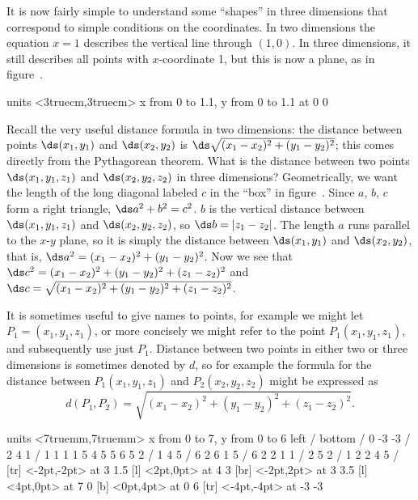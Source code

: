 It is now fairly simple to understand some ``shapes'' in three
dimensions that correspond to simple conditions on the coordinates. In
two dimensions the equation $x=1$ describes the vertical line through
$(1,0)$. In three dimensions, it still describes all points with
$x$-coordinate 1, but this is now a plane, as in
figure~.

\figure
\vbox{\beginpicture
\normalgraphs
\ninepoint
\setcoordinatesystem units <3truecm,3truecm>
\setplotarea x from 0 to 1.1, y from 0 to 1.1
 at 0 0
\endpicture}
\endfigure{The plane $x=1$.
(\expandafter\url\expandafter{\liveurl plane.html}%
AP\endurl)}

Recall the very useful distance formula in two dimensions: the
distance between points $\ds (x_1,y_1)$ and $\ds (x_2,y_2)$ is
$\ds \sqrt{(x_1-x_2)^2+(y_1-y_2)^2}$; this comes directly from the
Pythagorean theorem. What is the distance between two points
$\ds (x_1,y_1,z_1)$ and $\ds (x_2,y_2,z_2)$ in three dimensions?
Geometrically, we want the length of the long diagonal labeled $c$ in
the ``box'' in figure~. Since $a$,
$b$, $c$ form a right triangle, $\ds a^2+b^2=c^2$. $b$ is the vertical
distance between $\ds (x_1,y_1,z_1)$ and $\ds (x_2,y_2,z_2)$, so
$\ds b=|z_1-z_2|$.  The length $a$ runs parallel to the $x$-$y$ plane, so
it is simply the distance between $\ds (x_1,y_1)$ and $\ds (x_2,y_2)$, that
is, $\ds a^2=(x_1-x_2)^2+(y_1-y_2)^2$. Now we see that
$\ds c^2=(x_1-x_2)^2+(y_1-y_2)^2+(z_1-z_2)^2$ and
$\ds c=\sqrt{(x_1-x_2)^2+(y_1-y_2)^2+(z_1-z_2)^2}$. 

It is sometimes useful to give names to points, for example we might
let $P_1=(x_1,y_1,z_1)$, or more concisely we might refer to the point
$P_1(x_1,y_1,z_1)$, and subsequently use just $P_1$. Distance between
two points in either two or three dimensions is sometimes denoted by
$d$, so for example the formula for the distance between $P_1(x_1,y_1,z_1)$
and $P_2(x_2,y_2,z_2)$ might be expressed as
$$d(P_1,P_2)=\sqrt{(x_1-x_2)^2+(y_1-y_2)^2+(z_1-z_2)^2}.$$

\figure
\vbox{\beginpicture
\normalgraphs
\ninepoint
\setcoordinatesystem units <7truemm,7truemm>
\setplotarea x from 0 to 7, y from 0 to 6
\axis left /
\axis bottom /
 0 -3 -3 /
\setdashes
{} 2 4 1 /
 1 1 1 1 5 4 5 5 6 5 2 /
 1 4 5 /
 6 2 6 1 5 /
\setdots
{} 6 2 2 1 1 /
 2 5 2 /
\setsolid
{} 1 2 2 4 5 /
 [tr] <-2pt,-2pt> at 3 1.5
 [l] <2pt,0pt> at 4 3
 [br] <-2pt,2pt> at 3 3.5
 [l] <4pt,0pt> at 7 0
 [b] <0pt,4pt> at 0 6
 [tr] <-4pt,-4pt> at -3 -3
\endpicture}

